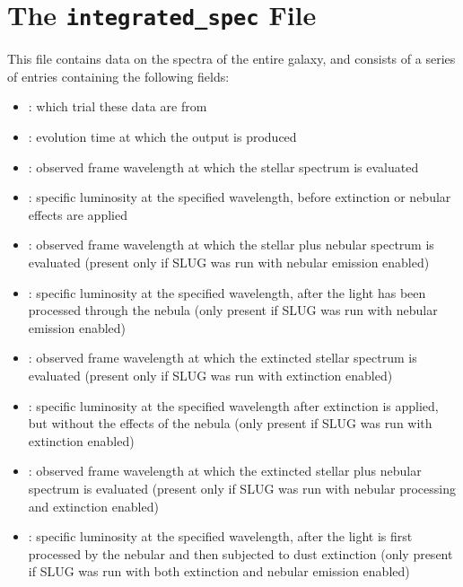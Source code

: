 \documentclass[letterpaper,10pt,english]{sphinxmanual}
\begin{document}
\section{The \texttt{integrated\_spec} File}
\label{output:the-integrated-spec-file}\label{output:ssec-int-spec-file}
This file contains data on the spectra of the entire galaxy, and consists of a series of entries containing the following fields:
\begin{itemize}
\item {} 
: which trial these data are from

\item {} 
: evolution time at which the output is produced

\item {} 
: observed frame wavelength at which the stellar spectrum is evaluated

\item {} 
: specific luminosity at the specified wavelength, before extinction or nebular effects are applied

\item {} 
: observed frame wavelength at which the stellar plus nebular spectrum is evaluated (present only if SLUG was run with nebular emission enabled)

\item {} 
: specific luminosity at the specified wavelength, after the light has been processed through the nebula (only present if SLUG was run with nebular emission enabled)

\item {} 
: observed frame wavelength at which the extincted stellar spectrum is evaluated (present only if SLUG was run with extinction enabled)

\item {} 
: specific luminosity at the specified wavelength after extinction is applied, but without the effects of the nebula (only present if SLUG was run with extinction enabled)

\item {} 
: observed frame wavelength at which the extincted stellar plus nebular spectrum is evaluated (present only if SLUG was run with nebular processing and  extinction enabled)

\item {} 
: specific luminosity at the specified wavelength, after the light is first processed by the nebular and then subjected to dust extinction (only present if SLUG was run with both extinction and nebular emission enabled)

\end{itemize}
\end{document}
